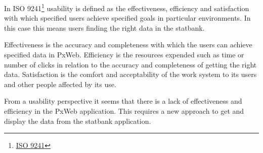\begin{figure}[bth]
    \myfloatalign
    \end{figure}
In ISO 9241\footnote{\href{https://www.iso.org/search.html?q=ISO\%209241}{ISO 9241}\label{iso9241}} usability is defined as the effectiveness, efficiency and satisfaction with which specified users achieve specified goals in particular environments. In this case this means users finding the right data in the statbank.
 
Effectiveness is the accuracy and completeness with which the users can achieve specified data in PxWeb.  Efficiency is the resources expended such as time or number of clicks in relation to the accuracy and completeness of getting the right data. Satisfaction is the comfort and acceptability of the work system to its users and other people affected by its use.

From a usability perspective it seems that there is a lack of effectiveness and efficiency in the PxWeb application. This requires a new approach to get and display the data from the statbank application.

